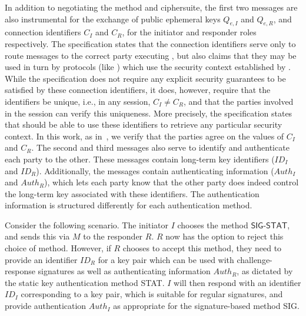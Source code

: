 \documentclass[runningheads]{llncs}
\newcommand{\mConstStyle}[1]{\textsf{#1}}
\newcommand{\mMethodStyle}[1]{\mConstStyle{#1}}
\newcommand{\mProtocolStyle}[1]{\text{#1}}
\newcommand{\mSpec}{specification}  %
\newcommand{\mEdhoc}{\mProtocolStyle{EDHOC}}
\newcommand{\mOscore}{\mProtocolStyle{OSCORE}}
\newcommand{\mStat}{\mMethodStyle{STAT}}
\newcommand{\mSig}{\mMethodStyle{SIG}}
\newcommand{\mSigStat}{\mMethodStyle{SIG-STAT}}
\newcommand{\mMethod}{\ensuremath{M}}
\newcommand{\mCi}{\ensuremath{C_I}}
\newcommand{\mCr}{\ensuremath{C_R}}
\newcommand{\mGx}{\ensuremath{Q_{e,I}}}
\newcommand{\mGy}{\ensuremath{Q_{e,R}}}
\newcommand{\mAuthi}{\ensuremath{\mathit{Auth}_I}}
\newcommand{\mAuthr}{\ensuremath{\mathit{Auth}_R}}
\newcommand{\mIdcredi}{\ensuremath{ID_I}}
\newcommand{\mIdcredr}{\ensuremath{ID_R}}
\begin{document}
In addition to negotiating the method and ciphersuite, the first two messages are
also instrumental for the exchange of public ephemeral keys \mGx{} and
\mGy{},
and connection identifiers \mCi{} and \mCr{}, for the initiator and responder
roles respectively.
%
The \mSpec{} states that the connection identifiers serve only to route
messages
to the correct party executing \mEdhoc{}, but also claims that they may be
used in turn by protocols (like \mOscore{}) which use the security context
established by \mEdhoc{}.
%
While the \mSpec{} does not require any explicit security guarantees to be
satisfied by these connection identifiers, it does, however, require that the
identifiers be unique, i.e., in any session, $\mCi{} \neq \mCr{}$, and that the
parties involved in the session can verify this uniqueness.
%
More precisely, the \mSpec{} states that \mOscore{} should be able to use these
identifiers to retrieve any particular security context.
%
In this work, as in~\cite{Norr21}, we verify that the parties agree on the
values of \mCi{} and \mCr{}.
%
The second and third messages also serve to identify and authenticate each
party to the other.
%
These messages contain long-term key identifiers (\mIdcredi{} and
\mIdcredr{}).
%
Additionally, the messages contain authenticating information
(\mAuthi{} and \mAuthr{}), which lets each
party know that the other party does indeed control the long-term key
associated with these identifiers.
%
The authentication information is structured differently for each authentication method.
%

Consider the following scenario.
%
The initiator $I$ chooses the method $\mSigStat{}$, and sends this via
$\mMethod{}$ to the responder $R$.
%
$R$ now has the option to reject this choice of method.
%
However, if $R$ chooses to accept this method, they need to provide an
identifier \mIdcredr{} for a key pair which can be used with
challenge-response
signatures
as well as authenticating information \mAuthr{}, as dictated by
the static key authentication method \mStat{}.
%
$I$ will then respond with an identifier \mIdcredi{} corresponding to a key
pair, which is suitable for regular signatures, and provide authentication
\mAuthi{} as appropriate for the signature-based method \mSig{}.

\end{document}
